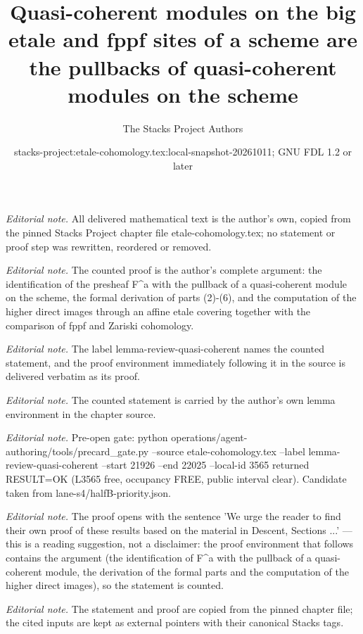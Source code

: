 \documentclass[10pt,a4paper]{amsart}
\title{Quasi-coherent modules on the big etale and fppf sites of a scheme are the pullbacks of quasi-coherent modules on the scheme}
\author{The Stacks Project Authors}
\date{stacks-project:etale-cohomology.tex:local-snapshot-20261011; GNU FDL 1.2 or later}
\theoremstyle{plain}
\theoremstyle{definition}
\theoremstyle{remark}
\numberwithin{equation}{subsection}
\begin{document}
\maketitle
\noindent\textit{Editorial note.} All delivered mathematical text is the author's own, copied from the pinned Stacks Project chapter file etale-cohomology.tex; no statement or proof step was rewritten, reordered or removed.\par\medskip
\noindent\textit{Editorial note.} The counted proof is the author's complete argument: the identification of the presheaf F\textasciicircum{}a with the pullback of a quasi-coherent module on the scheme, the formal derivation of parts (2)-(6), and the computation of the higher direct images through an affine etale covering together with the comparison of fppf and Zariski cohomology.\par\medskip
\noindent\textit{Editorial note.} The label lemma-review-quasi-coherent names the counted statement, and the proof environment immediately following it in the source is delivered verbatim as its proof.\par\medskip
\noindent\textit{Editorial note.} The counted statement is carried by the author's own lemma environment in the chapter source.\par\medskip
\noindent\textit{Editorial note.} Pre-open gate: python operations/agent-authoring/tools/precard\_gate.py --source etale-cohomology.tex --label lemma-review-quasi-coherent --start 21926 --end 22025 --local-id 3565 returned RESULT=OK (L3565 free, occupancy FREE, public interval clear). Candidate taken from lane-s4/halfB-priority.json.\par\medskip
\noindent\textit{Editorial note.} The proof opens with the sentence 'We urge the reader to find their own proof of these results based on the material in Descent, Sections ...' — this is a reading suggestion, not a disclaimer: the proof environment that follows contains the argument (the identification of F\textasciicircum{}a with the pullback of a quasi-coherent module, the derivation of the formal parts and the computation of the higher direct images), so the statement is counted.\par\medskip
\noindent\textit{Editorial note.} The statement and proof are copied from the pinned chapter file; the cited inputs are kept as external pointers with their canonical Stacks tags.\par\medskip
\end{document}

